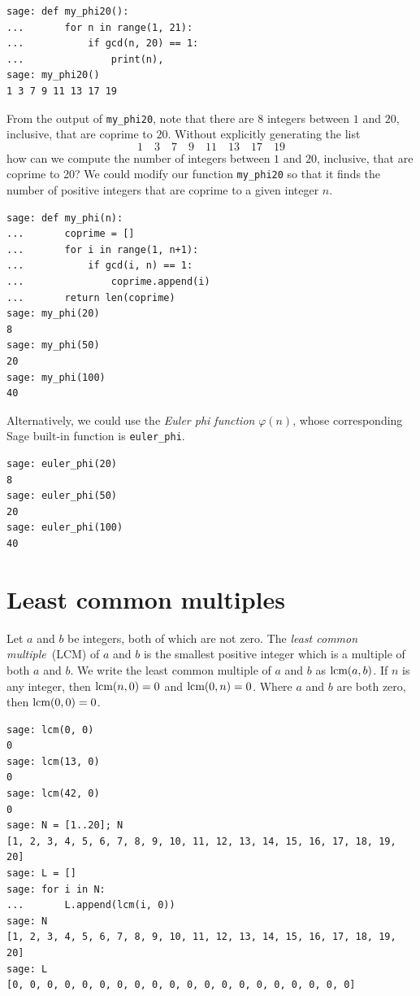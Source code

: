 \begin{lstlisting}
sage: def my_phi20():
...       for n in range(1, 21):
...           if gcd(n, 20) == 1:
...               print(n),
sage: my_phi20()
1 3 7 9 11 13 17 19
\end{lstlisting}
%
From the output of \verb!my_phi20!, note that there are $8$ integers
between $1$ and $20$, inclusive, that are coprime to $20$. Without
explicitly generating the list
%
\begin{equation}
\label{eq:integers_coprime_to_20}
1 \quad 3 \quad 7 \quad 9 \quad 11 \quad 13 \quad 17 \quad 19
\end{equation}
%
how can we compute the number of integers between $1$ and $20$,
inclusive, that are coprime to 20? We could modify our function
\verb!my_phi20! so that it finds the number of positive integers that
are coprime to a given integer $n$.

\begin{lstlisting}
sage: def my_phi(n):
...       coprime = []
...       for i in range(1, n+1):
...           if gcd(i, n) == 1:
...               coprime.append(i)
...       return len(coprime)
sage: my_phi(20)
8
sage: my_phi(50)
20
sage: my_phi(100)
40
\end{lstlisting}

Alternatively, we could use the \emph{Euler phi function}
$\varphi(n)$, whose corresponding Sage built-in function is
\verb!euler_phi!.

\begin{lstlisting}
sage: euler_phi(20)
8
sage: euler_phi(50)
20
sage: euler_phi(100)
40
\end{lstlisting}



\section{Least common multiples}

Let $a$ and $b$ be integers, both of which are not zero. The
\emph{least common multiple}~(LCM) of $a$ and $b$ is the smallest
positive integer which is a multiple of both $a$ and $b$. We write the
least common multiple of $a$ and $b$ as $\operatorname*{\text{lcm}}(a, b)$. If $n$ is any
integer, then $\operatorname*{\text{lcm}}(n, 0) = 0$ and $\operatorname*{\text{lcm}}(0, n) = 0$. Where $a$ and $b$
are both zero, then $\operatorname*{\text{lcm}}(0,0) = 0$.

\begin{lstlisting}
sage: lcm(0, 0)
0
sage: lcm(13, 0)
0
sage: lcm(42, 0)
0
sage: N = [1..20]; N
[1, 2, 3, 4, 5, 6, 7, 8, 9, 10, 11, 12, 13, 14, 15, 16, 17, 18, 19, 20]
sage: L = []
sage: for i in N:
...       L.append(lcm(i, 0))
sage: N
[1, 2, 3, 4, 5, 6, 7, 8, 9, 10, 11, 12, 13, 14, 15, 16, 17, 18, 19, 20]
sage: L
[0, 0, 0, 0, 0, 0, 0, 0, 0, 0, 0, 0, 0, 0, 0, 0, 0, 0, 0, 0]
\end{lstlisting}

